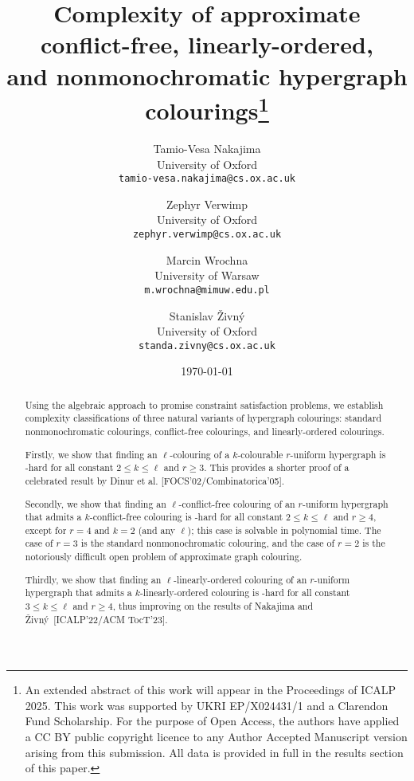 \documentclass[a4paper,11pt]{article}
\newcommand{\2}{\vec{2}}
\newcommand{\1}{\vec{1}}
\newcommand{\0}{\vec{0}}
\theoremstyle{plain}
\theoremstyle{definition}
\begin{document}
\title{Complexity of approximate conflict-free,  linearly-ordered,\\and nonmonochromatic hypergraph colourings\thanks{An extended abstract of this work will appear in the Proceedings of ICALP 2025. This work was supported by UKRI EP/X024431/1 and a Clarendon Fund Scholarship. For the purpose of Open Access, the authors have applied a CC BY public copyright licence to any Author Accepted Manuscript version arising from this submission. All data is provided in full in the results section of this paper.}}

\author{Tamio-Vesa Nakajima\\
University of Oxford\\
\texttt{tamio-vesa.nakajima@cs.ox.ac.uk}
\and
Zephyr Verwimp\\
University of Oxford\\
\texttt{zephyr.verwimp@cs.ox.ac.uk}
\and
Marcin Wrochna\\
University of Warsaw\\
\texttt{m.wrochna@mimuw.edu.pl}
\and
Stanislav \v{Z}ivn\'y\\
University of Oxford\\
\texttt{standa.zivny@cs.ox.ac.uk}
}

\date{\today}
\maketitle
\begin{abstract}
Using the algebraic approach to promise constraint satisfaction problems, we establish complexity classifications of three natural variants of hypergraph colourings: standard nonmonochromatic colourings, conflict-free colourings, and linearly-ordered colourings.

Firstly, we show that finding an $\ell$-colouring of a $k$-colourable $r$-uniform hypergraph is \NP-hard for all constant $2\leq k\leq \ell$ and $r\geq 3$. This provides a shorter proof of a celebrated result by Dinur et al. [FOCS'02/Combinatorica'05]. 

Secondly, we show that finding an $\ell$-conflict-free colouring of an $r$-uniform hypergraph that admits a $k$-conflict-free colouring is \NP-hard for all constant $2\leq k\leq\ell$ and $r\geq 4$, except for $r=4$ and $k=2$ (and any $\ell$); this case is solvable in polynomial time. The case of $r=3$ is the standard nonmonochromatic colouring, and the case of $r=2$ is the notoriously difficult open problem of approximate graph colouring.

Thirdly, we show that finding an $\ell$-linearly-ordered colouring of an $r$-uniform hypergraph that admits a $k$-linearly-ordered colouring is \NP-hard for all constant $3\leq k\leq\ell$ and $r\geq 4$, thus improving on the results of Nakajima and \v{Z}ivn\'y~[ICALP'22/ACM TocT'23].
\end{abstract}
\end{document}
